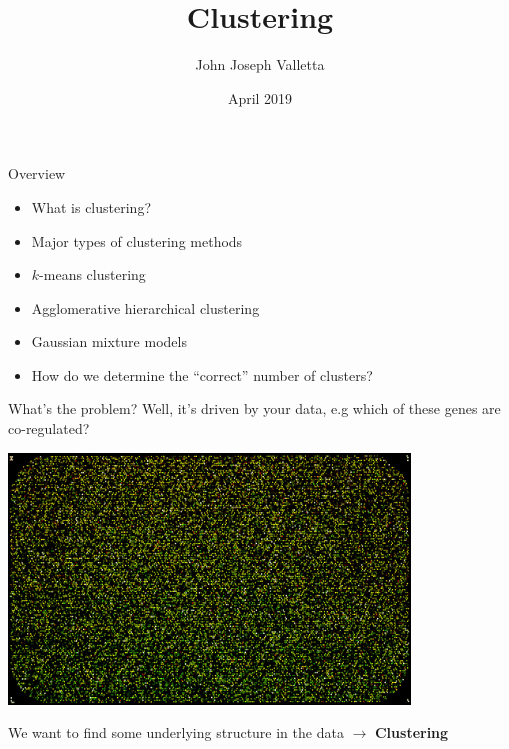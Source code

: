 \documentclass[pdf]{beamer}
\title[Clustering]{Clustering}
\author{John Joseph Valletta}
\date[April 2019]{April 2019}
\institute[]{University of Exeter, Penryn Campus, UK}
\begin{document}
\begin{frame}
\titlepage
\end{frame}

\begin{frame}{Overview}
\begin{itemize}\addtolength{\itemsep}{0.5\baselineskip}
	\item What is clustering?
	\item Major types of clustering methods
	\item $k$-means clustering
	\item Agglomerative hierarchical clustering
	\item Gaussian mixture models
	\item How do we determine the ``correct'' number of clusters?
\end{itemize}
\end{frame}
\begin{frame}{What's the problem?}
Well, it's driven by your data, e.g which of these genes are co-regulated?
\begin{center}
	\includegraphics[width=0.8\textwidth]{microArray.jpg}
\end{center}
We want to find some underlying structure in the data $\rightarrow$ \textbf{Clustering}
\end{frame}
\end{document}
